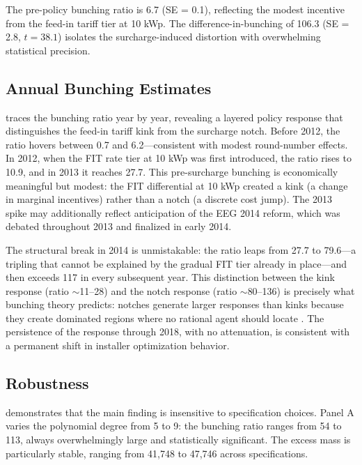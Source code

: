 \documentclass[12pt]{article}
\begin{document}
The pre-policy bunching ratio is 6.7 (SE = 0.1), reflecting the modest incentive from the feed-in tariff tier at 10 kWp. The difference-in-bunching of 106.3 (SE = 2.8, $t = 38.1$) isolates the surcharge-induced distortion with overwhelming statistical precision.



\subsection{Annual Bunching Estimates}

 traces the bunching ratio year by year, revealing a layered policy response that distinguishes the feed-in tariff kink from the surcharge notch. Before 2012, the ratio hovers between 0.7 and 6.2---consistent with modest round-number effects. In 2012, when the FIT rate tier at 10 kWp was first introduced, the ratio rises to 10.9, and in 2013 it reaches 27.7. This pre-surcharge bunching is economically meaningful but modest: the FIT differential at 10 kWp created a kink (a change in marginal incentives) rather than a notch (a discrete cost jump). The 2013 spike may additionally reflect anticipation of the EEG 2014 reform, which was debated throughout 2013 and finalized in early 2014.

The structural break in 2014 is unmistakable: the ratio leaps from 27.7 to 79.6---a tripling that cannot be explained by the gradual FIT tier already in place---and then exceeds 117 in every subsequent year. This distinction between the kink response (ratio $\sim$11--28) and the notch response (ratio $\sim$80--136) is precisely what bunching theory predicts: notches generate larger responses than kinks because they create dominated regions where no rational agent should locate \citep{kleven2016bunching}. The persistence of the response through 2018, with no attenuation, is consistent with a permanent shift in installer optimization behavior.



\subsection{Robustness}

 demonstrates that the main finding is insensitive to specification choices. Panel A varies the polynomial degree from 5 to 9: the bunching ratio ranges from 54 to 113, always overwhelmingly large and statistically significant. The excess mass is particularly stable, ranging from 41,748 to 47,746 across specifications.
\end{document}
